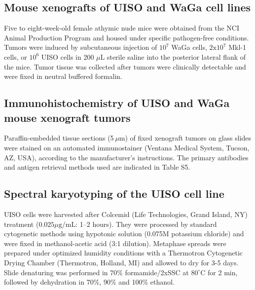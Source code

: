 \documentclass[10pt]{article}
\begin{document}
\subsection*{Mouse xenografts of UISO and WaGa cell lines}

Five to eight-week-old female athymic nude mice were obtained from the NCI Animal Production Program and housed under specific pathogen-free conditions.
Tumors were induced by subcutaneous injection of $10^7$ WaGa cells, $2\mathrm{x}10^7$ Mkl-1 cells, or $10^6$ UISO cells in 200 $\mu\mathrm{L}$ sterile saline into the posterior lateral flank of the mice.
Tumor tissue was collected after tumors were clinically detectable and were fixed in neutral buffered formalin.

\subsection*{Immunohistochemistry of UISO and WaGa mouse xenograft tumors}

Paraffin-embedded tissue sections (5 $\mu\mathrm{m}$) of fixed xenograft tumors on glass slides were stained on an automated immunostainer (Ventana Medical System, Tucson, AZ, USA), according to the manufacturer's instructions.
The primary antibodies and antigen retrieval methods used are indicated in Table S5.

\subsection*{Spectral karyotyping of the UISO cell line}

UISO cells were harvested after Colcemid (Life Technologies, Grand Island, NY) treatment ($0.025 \mu\textrm{g/mL}$: 1–2 hours).
They were processed by standard cytogenetic methods using hypotonic solution (0.075M potassium chloride) and were fixed in methanol-acetic acid (3:1 dilution).
Metaphase spreads were prepared under optimized humidity conditions with a Thermotron Cytogenetic Drying Chamber (Thermotron, Holland, MI) and allowed to dry for 3-5 days.
Slide denaturing was performed in 70\% formamide/2xSSC at $80^{\circ}\mathrm{C}$ for 2 min, followed by dehydration in 70\%, 90\% and 100\% ethanol.
\end{document}
